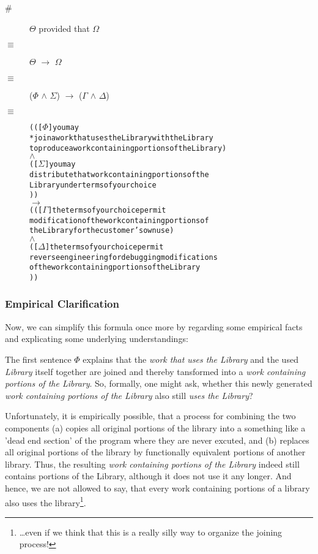 \begin{description}
  \item[\#]  $\Theta$ provided that $\Omega$
  \item[$\equiv$] $\Theta$ $\rightarrow$ $\Omega$
  \item[$\equiv$] ($\Phi$ $\wedge$ $\Sigma$) $\rightarrow$ ($\Gamma$ $\wedge$
  $\Delta$)
  \item[$\equiv$]
\begin{alltt}   
  ( ( [\(\Phi\)] you may 
       *join a work that uses the Library with the Library
       to produce a work containing portions of the Library )
  \(\wedge\)
  ( [\(\Sigma\)] you may 
        distribute that work containing portions of the 
        Library under terms of your choice 
) )
\(\rightarrow\)
( ( [\(\Gamma\)] the terms of your choice permit 
        modification of the work containing portions of 
        the Library for the customer's own use )
  \(\wedge\)
  ( [\(\Delta\)] the terms of your choice permit
        reverse engineering for debugging modifications 
        of the work containing portions of the Library   
) )
\end{alltt}
\end{description}

\subsubsection{Empirical Clarification}

Now, we can simplify this formula once more by regarding some empirical facts
and explicating some underlying understandings:

The first sentence $\Phi$ explains that the \emph{work that uses the Library}
and the used \emph{Library} itself together are joined and thereby tansformed
into a \emph{work containing portions of the Library}. So, formally, one might
ask, whether this newly generated \emph{work containing portions of the Library}
also still \emph{uses the Library}?

Unfortunately, it is empirically possible, that a process for combining the two
components (a) copies all original portions of the library into a something like
a 'dead end section' of the program where they are never excuted, and (b)
replaces all original portions of the library by functionally equivalent
portions of another library. Thus, the resulting \emph{work containing portions
of the Library} indeed still contains portions of the Library, although it does
not use it any longer. And hence, we are not allowed to say, that every work
containing portions of a library also uses the library\footnote{\ldots even if
we think that this is a really silly way to organize the joining process!}.

